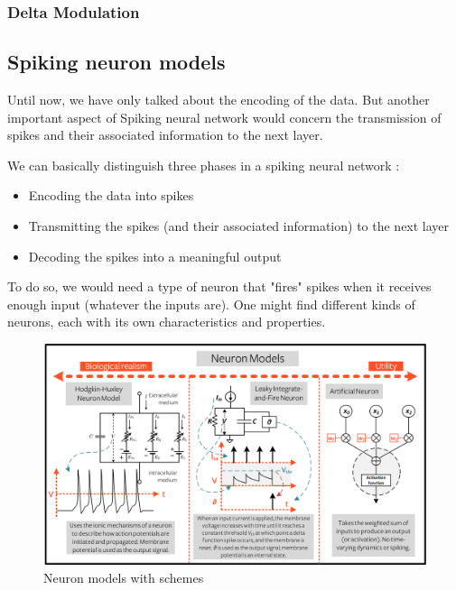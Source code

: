 \documentclass[11pt]{article}
\begin{document}
\subsubsection{Delta Modulation}

\subsection{Spiking neuron models}

Until now, we have only talked about the encoding of the data. But another important aspect of Spiking neural network would concern the transmission of spikes and their associated information to the next layer.

We can basically distinguish three phases in a spiking neural network :
\begin{itemize}
  \item Encoding the data into spikes
  \item Transmitting the spikes (and their associated information) to the next layer
  \item Decoding the spikes into a meaningful output
\end{itemize}

To do so, we would need a type of neuron that "fires" spikes when it receives enough input (whatever the inputs are). One might find different kinds of neurons, each with its own characteristics and properties.

\begin{figure}[H]
  \begin{center}
    \includegraphics[width=\textwidth]{./image/2_1_neuronmodels.png}
    \caption{Neuron models with schemes}
    \label{fig:neuronmodels_schemes}
  \end{center}
\end{figure}
\end{document}
